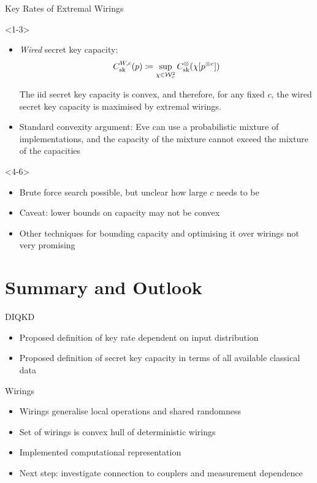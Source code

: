 \documentclass[xcolor=dvipsnames]{beamer}
\newcommand{\?}{\mathrel{?}} %
\newcommand{\sW}{\mathcal{W}}
\newcommand{\sk}{\rm sk}
\begin{document}
\begin{frame}{Key Rates of Extremal Wirings}
  \begin{onlyenv}<1-3>
    \begin{itemize}[<+->]
      \item \emph{Wired} secret key capacity:
        \[
            C^{W,c}_{\sk}(p) \coloneqq \sup_{\chi\in\sW_c^2} C^{\otimes}_{\sk}(\chi[p^{\otimes c}])
        \]
        \begin{theorem}
          The iid secret key capacity is convex, and therefore, for any fixed \(c\), the wired secret key capacity is maximised by extremal wirings.
        \end{theorem}
      \item Standard convexity argument: Eve can use a probabilistic mixture of implementations, and the capacity of the mixture cannot exceed the mixture of the capacities
    \end{itemize}
  \end{onlyenv}
  \begin{onlyenv}<4-6>
    \begin{itemize}[<+->]
      \item Brute force search possible, but unclear how large \(c\) needs to be
      \item Caveat: lower bounds on capacity may not be convex
      \item Other techniques for bounding capacity and optimising it over wirings not very promising
    \end{itemize}
  \end{onlyenv}
\end{frame}

\section*{Summary and Outlook}

\begin{frame}{DIQKD}
  \begin{itemize}[<+->]
    \item Proposed definition of key rate dependent on input distribution
    \item Proposed definition of secret key capacity in terms of all available classical data
  \end{itemize}
\end{frame}

\begin{frame}{Wirings}
  \begin{itemize}[<+->]
    \item Wirings generalise local operations and shared randomness
    \item Set of wirings is convex hull of deterministic wirings
    \item Implemented computational representation
    \item Next step: investigate connection to couplers and measurement dependence
  \end{itemize}
\end{frame}
\end{document}
